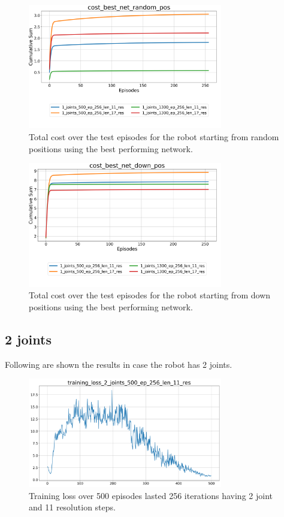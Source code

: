 \documentclass[twocolumn, a4paper]{article}
\begin{document}
\begin{figure}[H]
	\centering
	\includegraphics[width=8.5cm]{"../Figures/Summary_cost_best_net_random_pos_1J.png"}
	\caption{Total cost over the test episodes for the robot starting from
			 random positions using the best performing network.}
	\label{fig:Test_1_best_net_random_pos}
\end{figure}
\vspace{-1cm}
\begin{figure}[H]
	\centering
	\includegraphics[width=8.5cm]{"../Figures/Summary_cost_best_net_down_pos_1J.png"}
	\caption{Total cost over the test episodes for the robot starting from
			 down positions using the best performing network.}
	\label{fig:Test_1_best_net_down_pos}
\end{figure}

\subsection{2 joints}
Following are shown the results in case the robot has 2 joints.

\begin{figure}[H]
	\centering
	\includegraphics[width=8.5cm]{"../Figures/training_loss_2J_500E_256EL_11RES.png"}
	\caption{Training loss over 500 episodes lasted 256 iterations having 2
			 joint and 11 resolution steps.}
	\label{fig:TrainLoss_2_500_11}
\end{figure}
\end{document}
